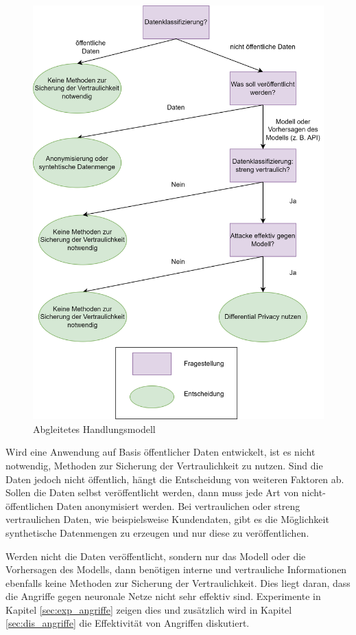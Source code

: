 \begin{figure}[!htb]
    \centering
    \includegraphics[width=14cm]{figures/Entscheidungsbaum.png}
    \caption{Abgleitetes Handlungsmodell}
    \label{fig:handlungsmodell}
\end{figure} 

Wird eine Anwendung auf Basis öffentlicher Daten entwickelt, ist es nicht notwendig, Methoden zur Sicherung der Vertraulichkeit zu nutzen.
Sind die Daten jedoch nicht öffentlich, hängt die Entscheidung von weiteren Faktoren ab.
Sollen die Daten selbst veröffentlicht werden, dann muss jede Art von nicht-öffentlichen Daten anonymisiert werden. 
Bei vertraulichen oder streng vertraulichen Daten, wie beispielsweise Kundendaten, gibt es die Möglichkeit synthetische Datenmengen zu erzeugen und nur diese zu veröffentlichen.

Werden nicht die Daten veröffentlicht, sondern nur das Modell oder die Vorhersagen des Modells, dann benötigen interne und vertrauliche Informationen ebenfalls keine Methoden zur Sicherung der Vertraulichkeit.
Dies liegt daran, dass die Angriffe gegen neuronale Netze nicht sehr effektiv sind. 
Experimente in Kapitel \ref{sec:exp_angriffe} zeigen dies und zusätzlich wird in Kapitel \ref{sec:dis_angriffe} die Effektivität von Angriffen diskutiert.

